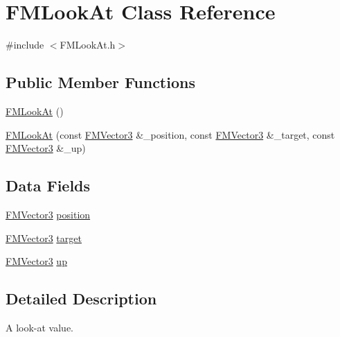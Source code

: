 \hypertarget{classFMLookAt}{
\section{FMLookAt Class Reference}
\label{classFMLookAt}
}


{\ttfamily \#include $<$FMLookAt.h$>$}

\subsection*{Public Member Functions}
\begin{DoxyCompactItemize}
\item 
\hyperlink{classFMLookAt_ade0b3f349d6f4cf3c37dd097f9e8cc47}{FMLookAt} ()
\item 
\hyperlink{classFMLookAt_a10b76b5f2d331ec5748ef72e15f9aba6}{FMLookAt} (const \hyperlink{classFMVector3}{FMVector3} \&\_\-position, const \hyperlink{classFMVector3}{FMVector3} \&\_\-target, const \hyperlink{classFMVector3}{FMVector3} \&\_\-up)
\end{DoxyCompactItemize}
\subsection*{Data Fields}
\begin{DoxyCompactItemize}
\item 
\hyperlink{classFMVector3}{FMVector3} \hyperlink{classFMLookAt_ac6a935d152b60654e88e0d1eca5eaf75}{position}
\item 
\hyperlink{classFMVector3}{FMVector3} \hyperlink{classFMLookAt_a1921262a8c2d6074189fc9b3c4da2dcf}{target}
\item 
\hyperlink{classFMVector3}{FMVector3} \hyperlink{classFMLookAt_aad5d1c7f21b35add5956972669befd6e}{up}
\end{DoxyCompactItemize}


\subsection{Detailed Description}
A look-\/at value. 

